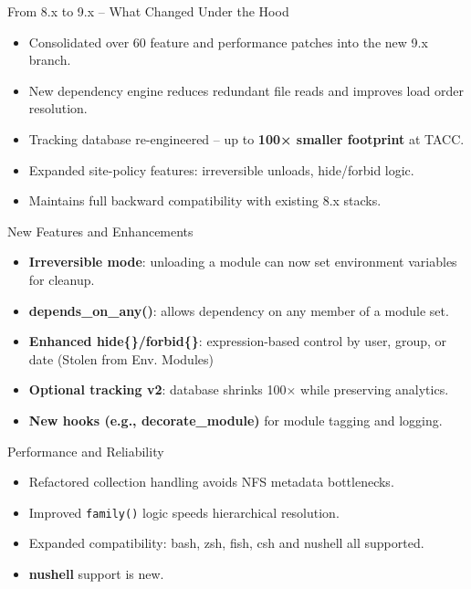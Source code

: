 \documentclass[aspectratio=169]{beamer}
\begin{document}
\begin{frame}{From 8.x to 9.x – What Changed Under the Hood}
  \begin{itemize}
    \item Consolidated over 60 feature and performance patches into the new 9.x branch.
    \item New dependency engine reduces redundant file reads and improves load order resolution.
    \item Tracking database re-engineered – up to \textbf{100× smaller footprint} at TACC.
    \item Expanded site-policy features: irreversible unloads, hide/forbid logic.
    \item Maintains full backward compatibility with existing 8.x stacks.
  \end{itemize}
\end{frame}

\begin{frame}{New Features and Enhancements}
  \begin{itemize}
    \item \textbf{Irreversible mode}: unloading a module can now set environment variables for cleanup.
    \item \textbf{depends\_on\_any()}: allows dependency on any member of a module set.
    \item \textbf{Enhanced hide\{\}/forbid\{\}}: expression-based
      control by user, group, or date (Stolen from Env. Modules)
    \item \textbf{Optional tracking v2}: database shrinks 100× while preserving analytics.
    \item \textbf{New hooks (e.g., decorate\_module)} for module tagging and logging.
  \end{itemize}
\end{frame}



\begin{frame}{Performance and Reliability}
  \begin{itemize}
    \item Refactored collection handling avoids NFS metadata bottlenecks.
    \item Improved \texttt{family()} logic speeds hierarchical resolution.
    \item Expanded compatibility: bash, zsh, fish, csh and nushell all supported.
    \item \textbf{nushell} support is new.
  \end{itemize}
\end{frame}
\end{document}
